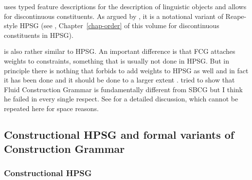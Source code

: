 \documentclass[output=paper]{langsci/langscibook}
\begin{document}
 \citep{BC2005a} uses typed feature descriptions for the description of
linguistic objects and allows for discontinuous constituents. As
argued by \citet[Section~10.6.3]{MuellerGT-Eng1}, it is a notational variant of Reape-style HPSG
\citep{Reape94a} (see \citealt[Section~\ref{sec-domains}]{chapters/order}, Chapter~\ref{chap-order}
of this volume for discontinuous constituents in HPSG).

 is also rather similar to HPSG. An important difference is that FCG attaches
weights to constraints, something that is usually not done in HPSG. But in principle there is
nothing that forbids to add weights to HPSG as well and in fact it has been done \citep{Brew95a,BC99a,MT2008a-u} and it should be
done to a larger extent \citep{Miller2013a}.  tried to show that
Fluid Construction Grammar is fundamentally different from SBCG but I think he failed in every
single respect. See  for a detailed discussion, which cannot be repeated here for
space reasons.




\subsection{Constructional HPSG and formal variants of Construction Grammar}



\subsubsection{Constructional HPSG}
\label{sec-constructional-hpsg}
\end{document}
